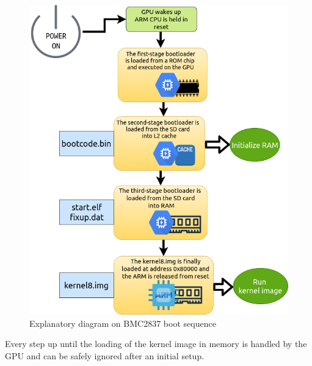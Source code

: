 \documentclass[12pt,a4paper,openright,twoside]{report}
\begin{document}
 \begin{figure}[t]
 \includegraphics[scale=0.6234]{images/tesi1.png}
 \caption[Figure 1]{Explanatory diagram on BMC2837 boot sequence}\label{fig:prima}
 \end{figure}
 \clearpage

Every step up until the loading of the kernel image in memory is handled by 
the GPU and can be safely ignored after an initial setup.
\end{document}
